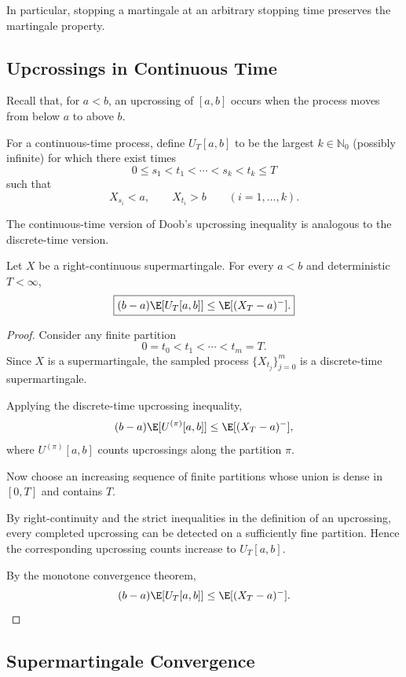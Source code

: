 In particular, stopping a martingale at an arbitrary
stopping time preserves the martingale property.

\subsection{Upcrossings in Continuous Time}

Recall that, for $a<b$, an upcrossing of $[a,b]$
occurs when the process moves from below $a$
to above $b$.

For a continuous-time process, define
$U_T[a,b]$ to be the largest $k\in\mathbb N_0$
(possibly infinite) for which there exist times
\[
    0\leq s_1<t_1<\cdots<s_k<t_k\leq T
\]
such that
\[
    X_{s_i}<a,
    \qquad
    X_{t_i}>b
    \qquad (i=1,\ldots,k).
\]

The continuous-time version of Doob's upcrossing
inequality is analogous to the discrete-time version.

\begin{theorem}
Let $X$ be a right-continuous supermartingale.
For every $a<b$ and deterministic $T<\infty$,
\[
    \boxed{
    (b-a)\E[U_T[a,b]]
    \leq \E[(X_T-a)^-].
    }
\]
\end{theorem}

\begin{proof}
Consider any finite partition
\[
    0=t_0<t_1<\cdots<t_m=T.
\]
Since $X$ is a supermartingale, the sampled process
$\{X_{t_j}\}_{j=0}^m$ is a discrete-time
supermartingale.

Applying the discrete-time upcrossing inequality,
\[
    (b-a)\E[U^{(\pi)}[a,b]]
    \leq \E[(X_T-a)^-],
\]
where $U^{(\pi)}[a,b]$ counts upcrossings along
the partition $\pi$.

Now choose an increasing sequence of finite
partitions whose union is dense in $[0,T]$
and contains $T$.

By right-continuity and the strict inequalities in
the definition of an upcrossing, every completed
upcrossing can be detected on a sufficiently fine
partition. Hence the corresponding upcrossing
counts increase to $U_T[a,b]$.

By the monotone convergence theorem,
\[
    (b-a)\E[U_T[a,b]]
    \leq \E[(X_T-a)^-].
\]
\end{proof}

\subsection{Supermartingale Convergence}


